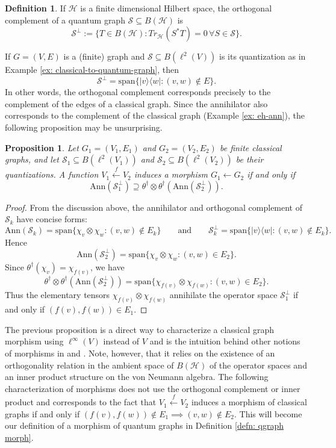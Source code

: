 \documentclass[12pt]{article}
\newtheorem{proposition}[theorem]{Proposition}
\theoremstyle{definition}
\newtheorem{definition}[theorem]{Definition}
\newenvironment{remark}
  {\pushQED{\qed}\renewcommand{\qedsymbol}{\textcircled{\tiny R}}\remarkx}
  {\popQED\endremarkx}
\newcommand{\Span}{\text{span}}
\newcommand{\mc}[1]{\mathcal{#1}}
\newcommand{\<}{\langle}
\renewcommand{\>}{\rangle}
\newcommand{\Ann}{\text{Ann}}
\renewcommand{\subset}{\subseteq}
\begin{document}
\begin{definition} 
    If $\mc H$ is a finite dimensional Hilbert space, the orthogonal complement of a quantum graph $\mc S \subseteq B(\mc H)$ is 
    \[
    \mc S^\perp := \{T \in B(\mc H) : Tr_{\mc H}(S^*T) = 0 \, \forall S \in \mc S\}.
    \]
\end{definition}
\begin{remark}
    If $G = (V,E)$ is a (finite) graph and $\mc S \subset B(\ell^2(V))$ is its quantization as in Example \ref{ex: classical-to-quantum-graph}, then 
    \[
    \mc S^\perp = \Span\{|v\>\<w| : (v,w) \notin E\}.
    \]
    In other words, the orthogonal complement corresponds precisely to the complement of the edges of a classical graph. Since the annihilator also corresponds to the complement of the classical graph (Example \ref{ex: eh-ann}), the following proposition may be unsurprising.
\end{remark}
\begin{proposition}\label{thm:classical-morphism}
    Let $G_1 = (V_1, E_1)$ and $G_2 = (V_2, E_2)$ be finite classical graphs, and let $\mc S_1 \subset B(\ell^2(V_1))$ and $\mc S_2 \subset B(\ell^2(V_2))$ be their quantizations. A function $V_1 \overset f \leftarrow V_2$ induces a morphism $G_1 \leftarrow G_2$ if and only if 
    \[
    \Ann(\mc S_1^\perp) \supseteq \theta^\dagger \otimes \theta^\dagger(\Ann(\mc S_2^\perp)).
    \]
\end{proposition}
\begin{proof}
    From the discussion above, the annihilator and orthogonal complement of $\mc S_k$ have concise forms:
    \[
    \Ann(\mc S_k) = \Span\{\chi_v \otimes \chi_w : (v,w) \notin E_k\} \qquad \text{and} \qquad
    \mc S_k^\perp = \Span\{|v\>\<w| : (v,w) \notin E_k\}.
    \]
    Hence
    \[
    \Ann(\mc S_2^\perp) = \Span\{\chi_v \otimes \chi_w : (v,w) \in E_2\}.
    \]
    Since $\theta^\dagger(\chi_v) = \chi_{f(v)}$, we have
    \[
    \theta^\dagger \otimes \theta^\dagger(\Ann(\mc S_2^\perp)) = \Span\{\chi_{f(v)}\otimes \chi_{f(w)}: (v,w) \in E_2\}.
    \]
    Thus the elementary tensors $\chi_{f(v)} \otimes \chi_{f(w)}$ annihilate the operator space $\mc S_1^\perp$ if and only if $(f(v), f(w)) \in E_1$.
\end{proof}

\begin{remark} 
The previous proposition is a direct way to characterize a classical graph morphism using $\ell^\infty(V)$ instead of $V$ and is the intuition behind other notions of morphisms in \cite[Proposition 5.3]{musto-reutter-verdon} and \cite[Definition 7.1]{daws}. Note, however, that it relies on the existence of an orthogonality relation in the ambient space of $B(\mc H)$ of the operator spaces and an inner product structure on the von Neumann algebra. The following characterization of morphisms does not use the orthogonal complement or inner product and corresponds to the fact that $V_1 \overset f \leftarrow V_2$ induces a morphism of classical graphs if and only if $(f(v), f(w)) \notin E_1 \implies (v,w) \not\in E_2$. This will become our definition of a morphism of quantum graphs in Definition \ref{defn: qgraph morph}.
\end{remark}
\end{document}

